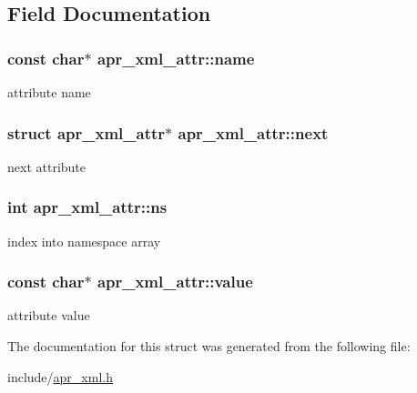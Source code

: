 \subsection{Field Documentation}
\hypertarget{structapr__xml__attr_a2ac25d74e3fd8a521b70af15ae8c1257}{
\subsubsection[{name}]{\setlength{\rightskip}{0pt plus 5cm}const char$\ast$ apr\-\_\-xml\-\_\-attr\-::name}}\label{structapr__xml__attr_a2ac25d74e3fd8a521b70af15ae8c1257}
attribute name \hypertarget{structapr__xml__attr_a89a314d3136128eb2a37146ddb30da4f}{
\subsubsection[{next}]{\setlength{\rightskip}{0pt plus 5cm}struct {\bf apr\-\_\-xml\-\_\-attr}$\ast$ apr\-\_\-xml\-\_\-attr\-::next}}\label{structapr__xml__attr_a89a314d3136128eb2a37146ddb30da4f}
next attribute \hypertarget{structapr__xml__attr_ad08daf8b0b47796aae04b6aeaa332bc2}{
\subsubsection[{ns}]{\setlength{\rightskip}{0pt plus 5cm}int apr\-\_\-xml\-\_\-attr\-::ns}}\label{structapr__xml__attr_ad08daf8b0b47796aae04b6aeaa332bc2}
index into namespace array \hypertarget{structapr__xml__attr_a12f0f611e426fe83704de92b3b11d2e3}{
\subsubsection[{value}]{\setlength{\rightskip}{0pt plus 5cm}const char$\ast$ apr\-\_\-xml\-\_\-attr\-::value}}\label{structapr__xml__attr_a12f0f611e426fe83704de92b3b11d2e3}
attribute value 

The documentation for this struct was generated from the following file\-:\begin{DoxyCompactItemize}
\item 
include/\hyperlink{apr__xml_8h}{apr\-\_\-xml.\-h}\end{DoxyCompactItemize}
